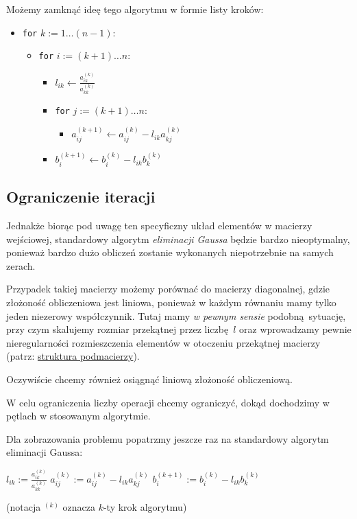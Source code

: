 \documentclass[10pt]{article}
\begin{document}
Możemy zamknąć ideę tego algorytmu w formie listy kroków:
\begin{itemize}
    \item \texttt{for} $k := 1\dots (n-1)$:
    \begin{itemize}
        \item \texttt{for} $i := (k+1)\dots n$:
        \begin{itemize}
            \item $l_{ik} \gets \frac{a_{ik}^{(k)}}{a_{kk}^{(k)}}$
            \item \texttt{for} $j := (k+1) \dots n$:
            \begin{itemize}
                \item $a_{ij}^{(k+1)} \gets a_{ij}^{(k)} - l_{ik} a_{kj}^{(k)}$
            \end{itemize}
            \item $b_i^{(k+1)} \gets b_i^{(k)} - l_{ik} b^{(k)}_k$
        \end{itemize}
    \end{itemize}
\end{itemize}

\subsection{Ograniczenie iteracji}

Jednakże biorąc pod uwagę ten specyficzny układ elementów w macierzy wejściowej, standardowy algorytm \textit{eliminacji Gaussa} będzie bardzo nieoptymalny, ponieważ bardzo dużo obliczeń zostanie wykonanych niepotrzebnie na samych zerach.

Przypadek takiej macierzy możemy porównać do macierzy diagonalnej, gdzie złożoność obliczeniowa jest liniowa, ponieważ w każdym równaniu mamy tylko jeden niezerowy współczynnik. Tutaj mamy \textit{w pewnym sensie} podobną sytuację, przy czym skalujemy rozmiar przekątnej przez liczbę $l$ oraz wprowadzamy pewnie nieregularności rozmieszczenia elementów w otoczeniu przekątnej macierzy (patrz: \hyperref[struktura-podmacierzy]{struktura podmacierzy}).

\noindent Oczywiście chcemy również osiągnąć liniową złożoność obliczeniową.

\noindent W celu ograniczenia liczby operacji chcemy ograniczyć, dokąd dochodzimy w pętlach w stosowanym algorytmie.

\noindent Dla zobrazowania problemu popatrzmy jeszcze raz na standardowy algorytm eliminacji Gaussa:
\begin{algorithm}[H]
    \begin{algorithmic}[1]

        \label{idea.for-i}
            \State $l_{ik} := \frac{a^{(k)}_{ik}}{a^{(k)}_{kk}}$
            \label{idea.for-j}
                \State $a_{ij}^{(k)} := a^{(k)}_{ij} - l_{ik} a_{kj}^{(k)}$
            \EndFor
            \State $b_i^{(k+1)} := b_i^{(k)} - l_{ik} b_k^{(k)}$
        \EndFor
      \EndFor
    \end{algorithmic}
\end{algorithm}
(notacja $^{(k)}$ oznacza $k$-ty krok algorytmu)
\end{document}
